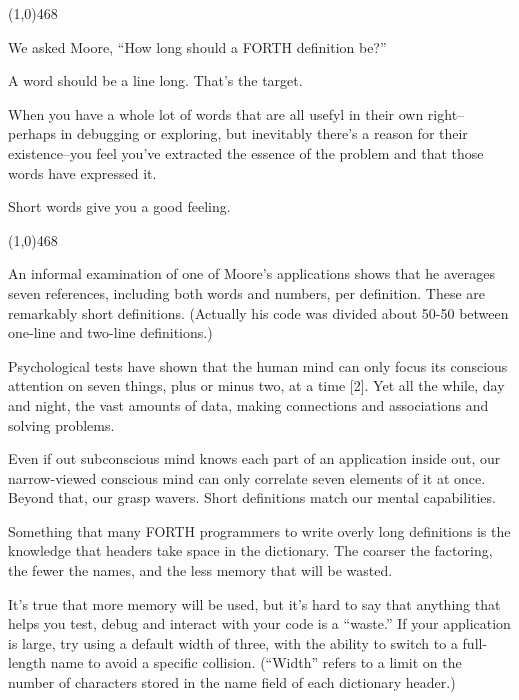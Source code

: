 \documentclass{book}
\begin{document}
\noindent
\line(1,0){468}

\noindent
We asked Moore, ``How long should a FORTH definition be?''

\begin{list}{}{}

\item
A word should be a line long. That's the target.

\item
When you have a whole lot of words that are all usefyl in their own right--perhaps in debugging or exploring, but inevitably there's a reason for their existence--you feel you've extracted the essence of the problem and that those words have expressed it.

\item
Short words give you a good feeling.

\end{list}{}{}

\noindent
\line(1,0){468}

\bigskip

\noindent
An informal examination of one of Moore's applications shows that he averages seven references, including both words and numbers, per definition. These are remarkably short definitions. (Actually his code was divided about 50-50 between one-line and two-line definitions.)

Psychological tests have shown that the human mind can only focus its conscious attention on seven things, plus or minus two, at a time [2]. Yet all the while, day and night, the vast amounts of data, making connections and associations and solving problems.

Even if out subconscious mind knows each part of an application inside out, our narrow-viewed conscious mind can only correlate seven elements of it at once. Beyond that, our grasp wavers. Short definitions match our mental capabilities.

Something that many FORTH programmers to write overly long definitions is the knowledge that headers take space in the dictionary. The coarser the factoring, the fewer the names, and the less memory that will be wasted.

It's true that more memory will be used, but it's hard to say that anything that helps you test, debug and interact with your code is a ``waste.'' If your application is large, try using a default width of three, with the ability to switch to a full-length name to avoid a specific collision. (``Width'' refers to a limit on the number of characters stored in the name field of each dictionary header.)
\end{document}
